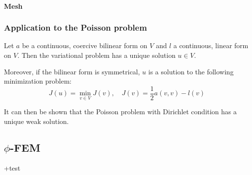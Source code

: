 \paragraph{Mesh}


\begin{Rem}
\end{Rem}

\subsubsection{Application to the Poisson problem}


\begin{Prop}
	
	Let $a$ be a continuous, coercive bilinear form on $V$ and $l$ a continuous, linear form on $V$. Then the variational problem has a unique solution $u\in V$. 
	
	Moreover, if the bilinear form is symmetrical, $u$ is a solution to the following minimization problem:
	\begin{equation*}
		J(u)=\min_{v\in V} J(v), \quad J(v)=\frac{1}{2}a(v,v)-l(v)
	\end{equation*}
\end{Prop}

It can then be shown that the Poisson problem with Dirichlet condition has a unique weak solution.


\subsection{$\phi$-FEM}


+test


